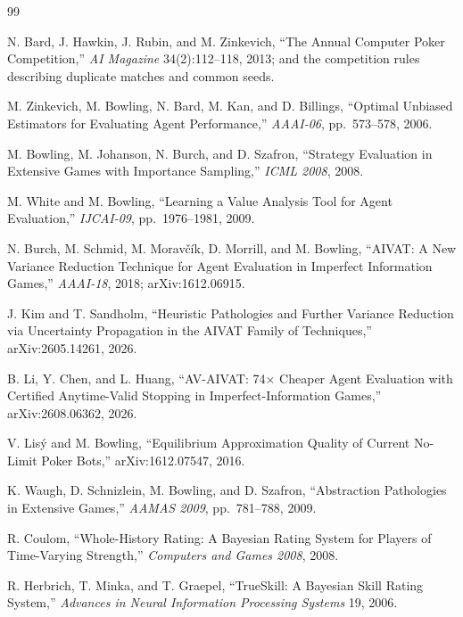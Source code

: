 \documentclass[11pt]{article}
\theoremstyle{definition}
\begin{document}
\begin{thebibliography}{99}

N. Bard, J. Hawkin, J. Rubin, and M. Zinkevich, ``The Annual Computer Poker
Competition,'' \emph{AI Magazine} 34(2):112--118, 2013; and the competition
rules describing duplicate matches and common seeds.

M. Zinkevich, M. Bowling, N. Bard, M. Kan, and D. Billings, ``Optimal Unbiased
Estimators for Evaluating Agent Performance,'' \emph{AAAI-06}, pp.~573--578,
2006.

M. Bowling, M. Johanson, N. Burch, and D. Szafron, ``Strategy Evaluation in
Extensive Games with Importance Sampling,'' \emph{ICML 2008}, 2008.

M. White and M. Bowling, ``Learning a Value Analysis Tool for Agent
Evaluation,'' \emph{IJCAI-09}, pp.~1976--1981, 2009.

N. Burch, M. Schmid, M. Morav\v{c}\'ik, D. Morrill, and M. Bowling, ``AIVAT: A
New Variance Reduction Technique for Agent Evaluation in Imperfect Information
Games,'' \emph{AAAI-18}, 2018; arXiv:1612.06915.

J. Kim and T. Sandholm, ``Heuristic Pathologies and Further Variance Reduction
via Uncertainty Propagation in the AIVAT Family of Techniques,''
arXiv:2605.14261, 2026.

B. Li, Y. Chen, and L. Huang, ``AV-AIVAT: 74$\times$ Cheaper Agent Evaluation
with Certified Anytime-Valid Stopping in Imperfect-Information Games,''
arXiv:2608.06362, 2026.

V. Lis\'y and M. Bowling, ``Equilibrium Approximation Quality of Current
No-Limit Poker Bots,'' arXiv:1612.07547, 2016.

K. Waugh, D. Schnizlein, M. Bowling, and D. Szafron, ``Abstraction Pathologies
in Extensive Games,'' \emph{AAMAS 2009}, pp.~781--788, 2009.

R. Coulom, ``Whole-History Rating: A Bayesian Rating System for Players of
Time-Varying Strength,'' \emph{Computers and Games 2008}, 2008.

R. Herbrich, T. Minka, and T. Graepel, ``TrueSkill\texttrademark: A Bayesian
Skill Rating System,'' \emph{Advances in Neural Information Processing Systems}
19, 2006.


\end{thebibliography}
\end{document}
